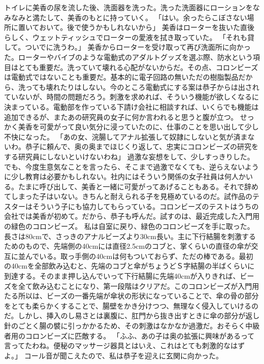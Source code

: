 トイレに美香の尿を流した後、洗面器を洗った。洗った洗面器にローションをなみなみと満たして、美香のもとに持っていく。
「はい。余ったらこぼさない場所に置いておいて。後で使うかもしれないから」
美香はローターを抜いた直後らしく、ウェットティッシュでローターの愛液を拭き取っていた。
「それも貸して。ついでに洗うわ。」
美香からローターを受け取って再び洗面所に向かった。ローターやバイブのような電動式のアダルトグッズを選ぶ際、防水という項目はとても重要だ。洗っていて壊れる心配がないからだ。その点、コロンビーズは電動式ではないことも重要だ。基本的に電子回路の無いただの樹脂製品だから、洗っても壊れたりはしない。今のところ電動式にする案は恭子からは出されていないが、時間の問題だろう。刺激を求めれば、そういう機能が欲しくなるに決まっている。電動部を作っている下請け会社に相談すれば、いくらでも機能は追加できるが、またあの研究員の女子に何か言われると思うと腹が立つ。
せっかく美香を可愛がって良い気分に浸っていたのに、仕事のことを思い出して少し不快になった。
「あの女、浣腸してアナル拡張して奴隷にしないと気が済まないわ。恭子に頼んで、奥の奥までほじくり返して、忠実にコロンビーズの研究をする研究員にしないといけないわね」
過激な妄想をして、少しすっきりした。でも、今度生意気なことを言ったら、そこまで過激でなくても、逆らえないように少し教育は必要かもしれない。社内にはそういう関係の女子社員は何人かいる。たまに呼び出して、美香と一緒に可愛がってあげることもある。それで辞めてしまった子はいない。きちんと耐えられる子を見極めているのだ。試作品のテスターはそういう子にも協力してもらっている。コロンビーズのテストはうちの会社では美香が初めて。だから、恭子も呼んだ。試すのは、最近完成した入門用の緑色のコロンビーズ。
私は自室に戻り、緑色のコロンビーズを手に取った。長さは80cmで、さっきのアナルビーズより30cm長い。主に下行結腸を刺激するためのもので、先端側の40cmには直径2.5cmのコブと、掌くらいの直径の傘が交互に並んでいる。取っ手側の40cmは何もついておらず、ただの棒である。最初の40cmを全部飲み込むと、先端のコブと傘がちょうどＳ字結腸の半ばくらいに到達する。そのまま押し込んでいって下行結腸に先端40cmが入りきれば、ビーズを全て飲み込むことになり、第一段階はクリアだ。このコロンビーズが入門用たる所以は、ビーズの一番先端が傘状の形状になっていることで、傘の骨の部分をとても柔らかくすることで、腸壁をかき分けつつ、無理なく侵入していけるのだ。しかし、挿入のし易さとは裏腹に、肛門から抜き出すときに傘の部分が返し針のごとく腸の襞に引っかかるため、その刺激はなかなか過激だ。おそらく中級者用のコロンビーズに匹敵する。
「ふふ、あの子は奥の拡張に興味があるって言ってたわね。便秘のマッサージ器具とはいえ、これはとても刺激的なはずよ。」
コール音が聞こえたので、私は恭子を迎えに玄関に向かった。

